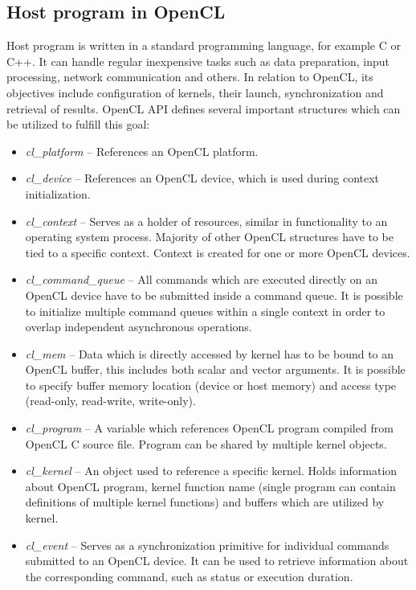 \documentclass
[
    digital, %
    oneside, %
    table, %
    nolof, %
    nolot, %
    nocover %
]{fithesis3}
\begin{document}
\subsection{Host program in OpenCL}
Host program is written in a standard programming language, for example C or C++. It can handle regular inexpensive tasks such as data preparation,
input processing, network communication and others. In relation to OpenCL, its objectives include configuration of kernels, their launch,
synchronization and retrieval of results. OpenCL API defines several important structures which can be utilized to fulfill this goal:
\begin{itemize}
    \item \textit{cl\_platform} -- References an OpenCL platform.
    \item \textit{cl\_device} -- References an OpenCL device, which is used during context initialization.
    \item \textit{cl\_context} -- Serves as a holder of resources, similar in functionality to an operating system process. Majority of other OpenCL
    structures have to be tied to a specific context. Context is created for one or more OpenCL devices.
    \item \textit{cl\_command\_queue} -- All commands which are executed directly on an OpenCL device have to be submitted inside a command queue. It
    is possible to initialize multiple command queues within a single context in order to overlap independent asynchronous operations.
    \item \textit{cl\_mem} -- Data which is directly accessed by kernel has to be bound to an OpenCL buffer, this includes both scalar and vector
    arguments. It is possible to specify buffer memory location (device or host memory) and access type (read-only, read-write, write-only).
    \item \textit{cl\_program} -- A variable which references OpenCL program compiled from OpenCL C source file. Program can be shared by multiple
    kernel objects.
    \item \textit{cl\_kernel} -- An object used to reference a specific kernel. Holds information about OpenCL program, kernel function name (single
    program can contain definitions of multiple kernel functions) and buffers which are utilized by kernel.
    \item \textit{cl\_event} -- Serves as a synchronization primitive for individual commands submitted to an OpenCL device. It can be used to retrieve
    information about the corresponding command, such as status or execution duration.
\end{itemize}
\end{document}
